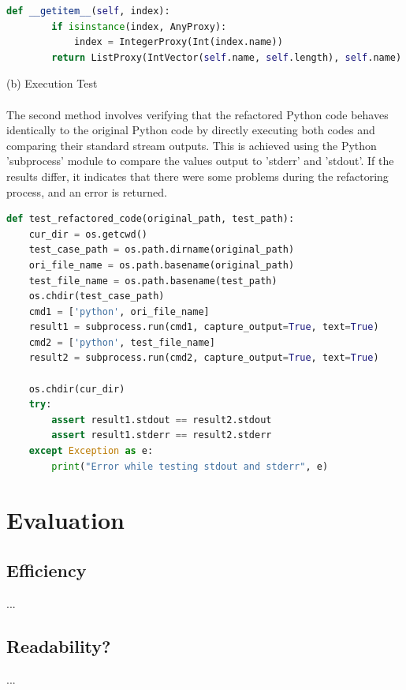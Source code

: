 \documentclass[11pt]{article}
\begin{document}
\begin{lstlisting}[language=python]
def __getitem__(self, index):
        if isinstance(index, AnyProxy):
            index = IntegerProxy(Int(index.name))
        return ListProxy(IntVector(self.name, self.length), self.name).__getitem__(index)
\end{lstlisting}


(b) Execution Test\\ \\

The second method involves verifying that the refactored Python code behaves identically to the original Python code by directly executing both codes and comparing their standard stream outputs. This is achieved using the Python 'subprocess' module to compare the values output to 'stderr' and 'stdout'. If the results differ, it indicates that there were some problems during the refactoring process, and an error is returned. \\
\begin{lstlisting}[language=python]
def test_refactored_code(original_path, test_path):
    cur_dir = os.getcwd()
    test_case_path = os.path.dirname(original_path)
    ori_file_name = os.path.basename(original_path)
    test_file_name = os.path.basename(test_path)
    os.chdir(test_case_path)
    cmd1 = ['python', ori_file_name]
    result1 = subprocess.run(cmd1, capture_output=True, text=True)
    cmd2 = ['python', test_file_name]
    result2 = subprocess.run(cmd2, capture_output=True, text=True)

    os.chdir(cur_dir)
    try:
        assert result1.stdout == result2.stdout
        assert result1.stderr == result2.stderr
    except Exception as e:
        print("Error while testing stdout and stderr", e)
\end{lstlisting}

\section{Evaluation}
\subsection{Efficiency}
...\\

\subsection{Readability?}
...\\
\end{document}
